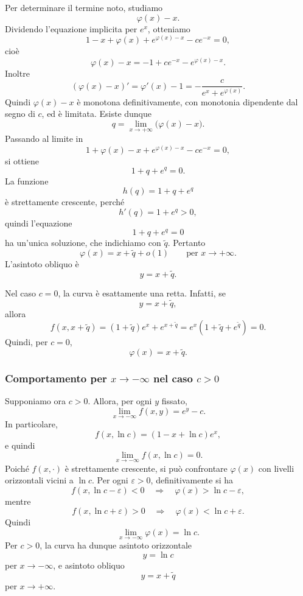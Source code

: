 \documentclass[a4paper]{article}
\begin{document}
Per determinare il termine noto, studiamo
\[
    \varphi(x)-x.
\]
Dividendo l'equazione implicita per \(e^x\), otteniamo
\[
    1-x+\varphi(x)+e^{\varphi(x)-x}-ce^{-x}=0,
\]
cioè
\[
    \varphi(x)-x
    =
    -1+ce^{-x}-e^{\varphi(x)-x}.
\]
Inoltre
\[
    (\varphi(x)-x)'
    =
    \varphi'(x)-1
    =
    -\frac{c}{e^x+e^{\varphi(x)}}.
\]
Quindi \(\varphi(x)-x\) è monotona definitivamente, con monotonia dipendente dal segno di \(c\), ed è limitata. Esiste dunque
\[
    q=\lim_{x\to+\infty}\bigl(\varphi(x)-x\bigr).
\]
Passando al limite in
\[
    1+\varphi(x)-x+e^{\varphi(x)-x}-ce^{-x}=0,
\]
si ottiene
\[
    1+q+e^q=0.
\]
La funzione
\[
    h(q)=1+q+e^q
\]
è strettamente crescente, perché
\[
    h'(q)=1+e^q>0,
\]
quindi l'equazione
\[
    1+q+e^q=0
\]
ha un'unica soluzione, che indichiamo con \(\widetilde q\). Pertanto
\[
    \varphi(x)=x+\widetilde q+o(1)
    \qquad
    \text{per } x\to+\infty.
\]
L'asintoto obliquo è
\[
    y=x+\widetilde q.
\]

\begin{center}
\end{center}

Nel caso \(c=0\), la curva è esattamente una retta. Infatti, se
\[
    y=x+\widetilde q,
\]
allora
\[
    f(x,x+\widetilde q)
    =
    (1+\widetilde q)e^x+e^{x+\widetilde q}
    =
    e^x(1+\widetilde q+e^{\widetilde q})
    =
    0.
\]
Quindi, per \(c=0\),
\[
    \varphi(x)=x+\widetilde q.
\]

\subsubsection{Comportamento per \(x\to-\infty\) nel caso \(c>0\)}

Supponiamo ora \(c>0\). Allora, per ogni \(y\) fissato,
\[
    \lim_{x\to-\infty}f(x,y)
    =
    e^y-c.
\]
In particolare,
\[
    f(x,\ln c)
    =
    (1-x+\ln c)e^x,
\]
e quindi
\[
    \lim_{x\to-\infty}f(x,\ln c)=0.
\]
Poiché \(f(x,\cdot)\) è strettamente crescente, si può confrontare \(\varphi(x)\) con livelli orizzontali vicini a \(\ln c\). Per ogni \(\varepsilon>0\), definitivamente si ha
\[
    f(x,\ln c-\varepsilon)<0
    \quad\Rightarrow\quad
    \varphi(x)>\ln c-\varepsilon,
\]
mentre
\[
    f(x,\ln c+\varepsilon)>0
    \quad\Rightarrow\quad
    \varphi(x)<\ln c+\varepsilon.
\]
Quindi
\[
    \lim_{x\to-\infty}\varphi(x)=\ln c.
\]
Per \(c>0\), la curva ha dunque asintoto orizzontale
\[
    y=\ln c
\]
per \(x\to-\infty\), e asintoto obliquo
\[
    y=x+\widetilde q
\]
per \(x\to+\infty\).
\end{document}
